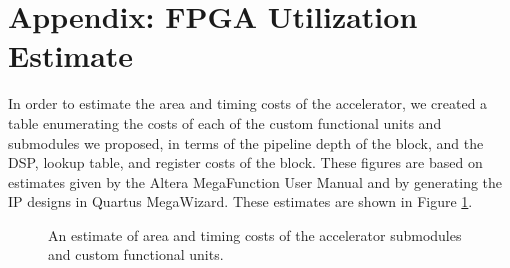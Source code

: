 \section{Appendix: FPGA Utilization Estimate}
In order to estimate the area and timing costs of the accelerator, we created a table enumerating the costs of each of the custom functional units and submodules we proposed, in terms of the pipeline depth of the block, and the DSP, lookup table, and register costs of the block. These figures are based on estimates given by the Altera MegaFunction User Manual and by generating the IP designs in Quartus MegaWizard. These estimates are shown in Figure \ref{fig:bill_of_materials}.

\begin{figure}[ht]
\center
{}
\caption{An estimate of area and timing costs of the accelerator submodules and custom functional units.}
\label{fig:bill_of_materials}
\end{figure}
